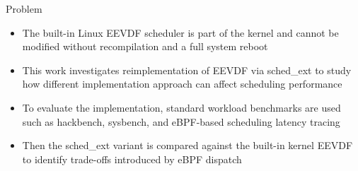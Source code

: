\documentclass[aspectratio=169]{beamer}
\begin{document}
\begin{frame}{Problem}
        \begin{itemize}
                \item The built-in Linux EEVDF scheduler is part of
                        the kernel and cannot be modified without
                        recompilation and a full system reboot

                        \vspace{0.3em}
                \item This work investigates reimplementation of EEVDF
                        via sched\_ext to study how different implementation
                        approach can affect scheduling performance

                        \vspace{0.3em}
                \item To evaluate the implementation, standard
                        workload benchmarks are used such as
                        hackbench, sysbench, and eBPF-based
                        scheduling latency tracing

                        \vspace{0.3em}
                \item Then the sched\_ext variant is compared against
                        the built-in kernel EEVDF to identify
                        trade-offs introduced by eBPF dispatch
        \end{itemize}
\end{frame}
\end{document}
